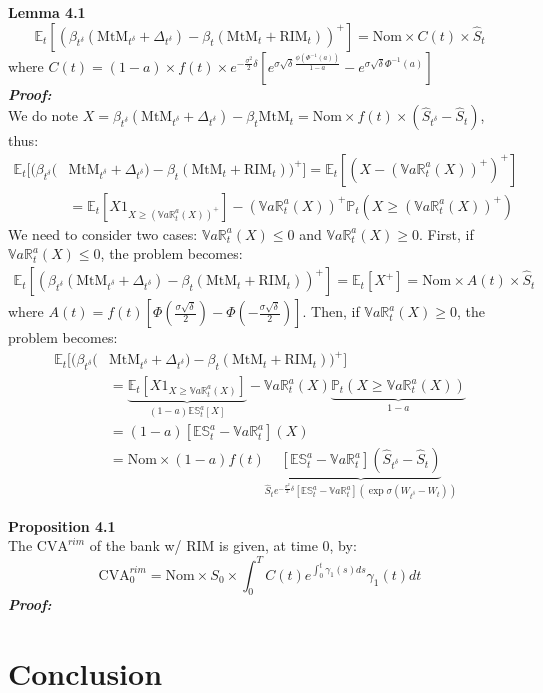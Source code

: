\documentclass[11pt,a4paper]{article}
\newcommand{\VaR}[2]{\mathbb{V}a\mathbb{R}^{#1}_{#2}}
\newcommand{\ES}[2]{\mathbb{ES}^{#1}_{#2}}
\begin{document}
\noindent\textbf{Lemma 4.1}
\[
\mathbb{E}_t\left[ \left( \beta_{t^\delta} \left( \text{MtM}_{t^\delta} + \Delta_{t^\delta} \right) - \beta_t \left( \text{MtM}_t + \text{RIM}_t \right) \right)^+ \right] = \text{Nom} \times C(t) \times \hat{S}_t
\]
where $C(t) = (1-a) \times f(t) \times e^{-\frac{\sigma^2}{2}\delta}\left[ e^{\sigma\sqrt{\delta}\frac{\phi\left(\Phi^{-1}(a)\right)}{1-a}} - e^{\sigma\sqrt{\delta}\Phi^{-1}(a)} \right]$\\
\textbf{\textit{Proof:}}\\
We do note $X=\beta_{t^\delta} \left( \text{MtM}_{t^\delta} + \Delta_{t^\delta} \right) - \beta_t \text{MtM}_t = \text{Nom}\times f(t) \times \left( \hat{S}_{t^\delta}-\hat{S}_t \right)$, thus:
\begin{align*}
    \mathbb{E}_t[ ( \beta_{t^\delta} ( &\text{MtM}_{t^\delta} + \Delta_{t^\delta} ) - \beta_t ( \text{MtM}_t + \text{RIM}_t ) )^+ ] = \mathbb{E}_t\left[\left(X-\left(\VaR{a}{t}\left(X\right)\right)^+\right)^+\right]\\
    &=\mathbb{E}_t\left[X1_{X\ge\left(\VaR{a}{t}\left(X\right)\right)^+}\right]-\left(\VaR{a}{t}\left(X\right)\right)^+\mathbb{P}_t\left(X\ge\left(\VaR{a}{t}\left(X\right)\right)^+\right)
\end{align*}
We need to consider two cases: $\VaR{a}{t}\left(X\right)\le0$ and $\VaR{a}{t}\left(X\right)\ge0$. First, if $\VaR{a}{t}\left(X\right)\le0$, the problem becomes:
\begin{align*}
    \mathbb{E}_t\left[ \left( \beta_{t^\delta} \left( \text{MtM}_{t^\delta} + \Delta_{t^\delta} \right) - \beta_t \left( \text{MtM}_t + \text{RIM}_t \right) \right)^+ \right] = \mathbb{E}_t\left[X^+\right] = \text{Nom} \times A(t) \times \hat{S}_t
\end{align*}
where $A(t) = f(t)\left[ \Phi\left( \frac{\sigma\sqrt{\delta}}{2} \right) - \Phi\left(- \frac{\sigma\sqrt{\delta}}{2} \right)\right]$. Then, if $\VaR{a}{t}\left(X\right)\ge0$, the problem becomes:
\begin{align*}
    \mathbb{E}_t[ ( \beta_{t^\delta} ( &\text{MtM}_{t^\delta} + \Delta_{t^\delta}) - \beta_t \left( \text{MtM}_t + \text{RIM}_t \right))^+ ]\\
    &= \underbrace{\mathbb{E}_t\left[X1_{X\ge\VaR{a}{t}\left(X\right)}\right]}_{(1-a)\ES{a}{t}[X]}-\VaR{a}{t}\left(X\right)\underbrace{\mathbb{P}_t\left(X\ge\VaR{a}{t}\left(X\right)\right)}_{1-a}\\
    &=(1-a)\left[ \ES{a}{t} - \VaR{a}{t} \right](X)\\
    &=\text{Nom}\times(1-a)f(t)\underbrace{\left[ \ES{a}{t} - \VaR{a}{t} \right]\left( \hat{S}_{t^\delta}-\hat{S}_t \right)}_{\hat{S}_t e^{-\frac{\sigma^2}{2}\delta}\left[ \ES{a}{t} - \VaR{a}{t} \right]\left( \exp{\sigma\left(W_{t^\delta} - W_t\right)} \right)}
\end{align*}





\noindent\textbf{Proposition 4.1}\\
The $\text{CVA}^{rim}$ of the bank w/ RIM is given, at time 0, by:
\[
\text{CVA}_0^{rim} = \text{Nom} \times S_0 \times \int_0^T C(t)e^{\int_0^t \gamma_1(s)ds}\gamma_1(t) dt
\]
\textbf{\textit{Proof:}}\\






\section{Conclusion}
\end{document}
